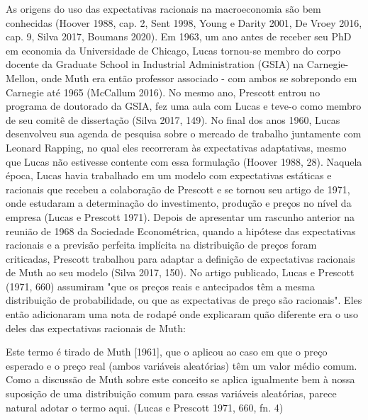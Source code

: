 \documentclass[12pt]{article}
\begin{document}
As origens do uso das expectativas racionais na macroeconomia são bem conhecidas (Hoover 1988, cap. 2, Sent 1998, Young e Darity 2001, De Vroey 2016, cap. 9, Silva 2017, Boumans 2020). Em 1963, um ano antes de receber seu PhD em economia da Universidade de Chicago, Lucas tornou-se membro do corpo docente da Graduate School in Industrial Administration (GSIA) na Carnegie-Mellon, onde Muth era então professor associado - com ambos se sobrepondo em Carnegie até 1965 (McCallum 2016). No mesmo ano, Prescott entrou no programa de doutorado da GSIA, fez uma aula com Lucas e teve-o como membro de seu comitê de dissertação (Silva 2017, 149). No final dos anos 1960, Lucas desenvolveu sua agenda de pesquisa sobre o mercado de trabalho juntamente com Leonard Rapping, no qual eles recorreram às expectativas adaptativas, mesmo que Lucas não estivesse contente com essa formulação (Hoover 1988, 28). Naquela época, Lucas havia trabalhado em um modelo com expectativas estáticas e racionais que recebeu a colaboração de Prescott e se tornou seu artigo de 1971, onde estudaram a determinação do investimento, produção e preços no nível da empresa (Lucas e Prescott 1971). Depois de apresentar um rascunho anterior na reunião de 1968 da Sociedade Econométrica, quando a hipótese das expectativas racionais e a previsão perfeita implícita na distribuição de preços foram criticadas, Prescott trabalhou para adaptar a definição de expectativas racionais de Muth ao seu modelo (Silva 2017, 150). No artigo publicado, Lucas e Prescott (1971, 660) assumiram "que os preços reais e antecipados têm a mesma distribuição de probabilidade, ou que as expectativas de preço são racionais". Eles então adicionaram uma nota de rodapé onde explicaram quão diferente era o uso deles das expectativas racionais de Muth:

Este termo é tirado de Muth [1961], que o aplicou ao caso em que o preço esperado e o preço real (ambos variáveis aleatórias) têm um valor médio comum. Como a discussão de Muth sobre este conceito se aplica igualmente bem à nossa suposição de uma distribuição comum para essas variáveis aleatórias, parece natural adotar o termo aqui. (Lucas e Prescott 1971, 660, fn. 4)
\end{document}

